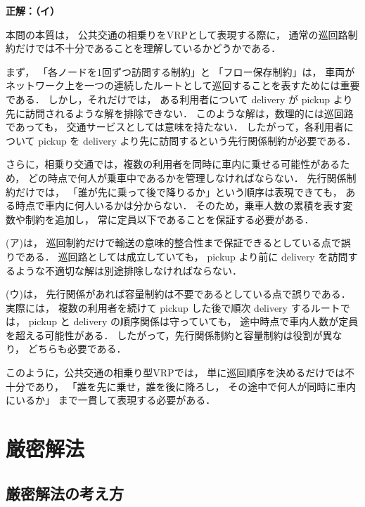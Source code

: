 \begin{example}[title={クイズ4 正解・解説}]
\label{ans:rideshare2}
\textbf{正解：（イ）}

本問の本質は，
公共交通の相乗りをVRPとして表現する際に，
通常の巡回路制約だけでは不十分であることを理解しているかどうかである．

まず，
「各ノードを1回ずつ訪問する制約」と
「フロー保存制約」は，
車両がネットワーク上を一つの連続したルートとして巡回することを表すためには重要である．
しかし，それだけでは，
ある利用者について delivery が pickup より先に訪問されるような解を排除できない．
このような解は，数理的には巡回路であっても，
交通サービスとしては意味を持たない．
したがって，各利用者について pickup を delivery より先に訪問するという先行関係制約が必要である．

さらに，相乗り交通では，複数の利用者を同時に車内に乗せる可能性があるため，
どの時点で何人が乗車中であるかを管理しなければならない．
先行関係制約だけでは，
「誰が先に乗って後で降りるか」という順序は表現できても，
ある時点で車内に何人いるかは分からない．
そのため，乗車人数の累積を表す変数や制約を追加し，
常に定員以下であることを保証する必要がある．

(ア)は，
巡回制約だけで輸送の意味的整合性まで保証できるとしている点で誤りである．
巡回路としては成立していても，
pickup より前に delivery を訪問するような不適切な解は別途排除しなければならない．

(ウ)は，
先行関係があれば容量制約は不要であるとしている点で誤りである．
実際には，
複数の利用者を続けて pickup した後で順次 delivery するルートでは，
pickup と delivery の順序関係は守っていても，
途中時点で車内人数が定員を超える可能性がある．
したがって，先行関係制約と容量制約は役割が異なり，
どちらも必要である．

このように，公共交通の相乗り型VRPでは，
単に巡回順序を決めるだけでは不十分であり，
「誰を先に乗せ，誰を後に降ろし，
その途中で何人が同時に車内にいるか」
まで一貫して表現する必要がある．

\end{example}



\section{厳密解法}
\label{sec:strict}

\subsection{厳密解法の考え方}


